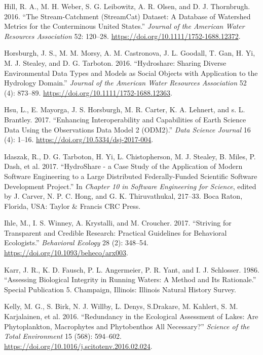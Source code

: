 \documentclass[fleqn,10pt,lineno]{wlpeerj} %
\begin{document}
\leavevmode\hypertarget{ref-Hill16}{}%
Hill, R. A., M. H. Weber, S. G. Leibowitz, A. R. Olsen, and D. J. Thornbrugh. 2016. ``The Stream-Catchment (StreamCat) Dataset: A Database of Watershed Metrics for the Conterminous United States.'' \emph{Journal of the American Water Resources Association} 52: 120--28. \url{https://doi.org/10.1111/1752-1688.12372}.

\leavevmode\hypertarget{ref-Horsburgh16}{}%
Horsburgh, J. S., M. M. Morsy, A. M. Castronova, J. L. Goodall, T. Gan, H. Yi, M. J. Stealey, and D. G. Tarboton. 2016. ``Hydroshare: Sharing Diverse Environmental Data Types and Models as Social Objects with Application to the Hydrology Domain.'' \emph{Journal of the American Water Resources Association} 52 (4): 873--89. \url{https://doi.org/10.1111/1752-1688.12363}.

\leavevmode\hypertarget{ref-Hsu17}{}%
Hsu, L., E. Mayorga, J. S. Horsburgh, M. R. Carter, K. A. Lehnert, and s. L. Brantley. 2017. ``Enhancing Interoperability and Capabilities of Earth Science Data Using the Observations Data Model 2 (ODM2).'' \emph{Data Science Journal} 16 (4): 1--16. \url{https://doi.org/10.5334/dsj-2017-004}.

\leavevmode\hypertarget{ref-Idaszak17}{}%
Idaszak, R., D. G. Tarboton, H. Yi, L. Chistopherson, M. J. Stealey, B. Miles, P. Dash, et al. 2017. ``HydroShare - a Case Study of the Application of Modern Software Engineering to a Large Distributed Federally-Funded Scientific Software Development Project.'' In \emph{Chapter 10 in Software Engineering for Science}, edited by J. Carver, N. P. C. Hong, and G. K. Thiruvathukal, 217--33. Boca Raton, Florida, USA: Taylor \& Francis CRC Press.

\leavevmode\hypertarget{ref-Ihle17}{}%
Ihle, M., I. S. Winney, A. Krystalli, and M. Croucher. 2017. ``Striving for Transparent and Credible Research: Practical Guidelines for Behavioral Ecologists.'' \emph{Behavioral Ecology} 28 (2): 348--54. \url{https://doi.org/10.1093/beheco/arx003}.

\leavevmode\hypertarget{ref-Karr86}{}%
Karr, J. R., K. D. Fausch, P. L. Angermeier, P. R. Yant, and I. J. Schlosser. 1986. ``Assessing Biological Integrity in Running Waters: A Method and Its Rationale.'' Special Publication 5. Champaign, Illinois: Illinois Natural History Survey.

\leavevmode\hypertarget{ref-Kelly16}{}%
Kelly, M. G., S. Birk, N. J. Willby, L. Denys, S.Drakare, M. Kahlert, S. M. Karjalainen, et al. 2016. ``Redundancy in the Ecological Assessment of Lakes: Are Phytoplankton, Macrophytes and Phytobenthos All Necessary?'' \emph{Science of the Total Environment} 15 (568): 594--602. \url{https://doi.org/10.1016/j.scitotenv.2016.02.024}.
\end{document}
